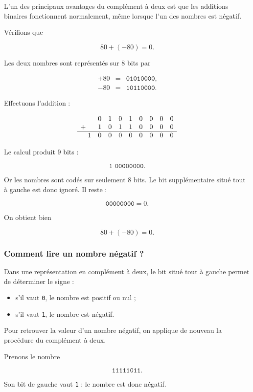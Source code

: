\documentclass[11pt, a4paper]{book}
\begin{document}
L'un des principaux avantages du complément à deux est que les additions
binaires fonctionnent normalement, même lorsque l'un des nombres est
négatif.

Vérifions que

\[
    80+(-80)=0.
\]

Les deux nombres sont représentés sur 8 bits par

\[
\begin{array}{rcl}
+80 &=& \texttt{01010000},\\
-80 &=& \texttt{10110000}.
\end{array}
\]

Effectuons l'addition :

\[
\begin{array}{r@{\;}*{9}{c}}
  &   &0&1&0&1&0&0&0&0\\
+ &   &1&0&1&1&0&0&0&0\\
\hline
  & 1&0&0&0&0&0&0&0&0
\end{array}
\]

Le calcul produit 9 bits :

\[
    \texttt{1 00000000}.
\]

Or les nombres sont codés sur seulement 8 bits. Le bit supplémentaire situé
tout à gauche est donc ignoré. Il reste :

\[
    \texttt{00000000}=0.
\]

On obtient bien

\[
    80+(-80)=0.
\]

\subsubsection{Comment lire un nombre négatif ?}

Dans une représentation en complément à deux, le bit situé tout à gauche
permet de déterminer le signe :

\begin{itemize}
    \item s'il vaut \texttt{0}, le nombre est positif ou nul ;
    \item s'il vaut \texttt{1}, le nombre est négatif.
\end{itemize}

Pour retrouver la valeur d'un nombre négatif, on applique de nouveau la
procédure du complément à deux.

Prenons le nombre

\[
    \texttt{11111011}.
\]

Son bit de gauche vaut \texttt{1} : le nombre est donc négatif.
\end{document}

